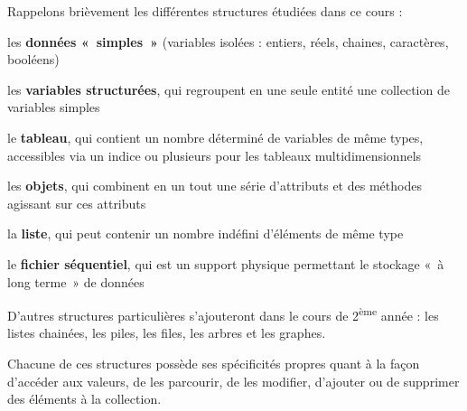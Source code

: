 Rappelons brièvement les différentes structures étudiées dans ce cours
 :

\begin{liste}
	\item 
		les \textbf{données «~simples~»} (variables isolées : entiers, réels,
		chaines, caractères, booléens)
	\item 
		les \textbf{variables structurées}, qui regroupent en une seule entité
		une collection de variables simples
	\item 
		le \textbf{tableau}, qui contient un nombre déterminé de variables de
		même types, accessibles via un indice ou plusieurs pour les tableaux
		multidimensionnels
	\item 
		les \textbf{objets}, qui combinent en un tout une série d’attributs et
		des méthodes agissant sur ces attributs
	\item 
		la \textbf{liste}, qui peut contenir un nombre indéfini d’éléments de
		même type
	\item 
		le \textbf{fichier séquentiel}, qui est un support physique permettant
		le stockage «~à long terme~» de données
\end{liste}

D’autres structures particulières s’ajouteront dans le cours de
2\textsuperscript{ème} année : les listes chainées, les piles, les
files, les arbres et les graphes.

Chacune de ces structures possède ses spécificités propres quant à la
façon d’accéder aux valeurs, de les parcourir, de les modifier,
d’ajouter ou de supprimer des éléments à la collection. 




